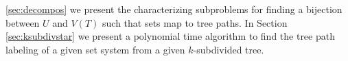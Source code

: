 \documentclass{fsttcs}
\def\cF{{\cal F}}
\def\cH{{\cal H}}
\def\F{{\mathcal F}}
\begin{document}
\ref{sec:decompos} we present the characterizing subproblems for finding a
bijection between $U$ and $V(T)$ such that sets map to tree
paths. In Section \ref{sec:ksubdivstar} we present a polynomial time
algorithm to find the tree path labeling of a given set system from a
given $k$-subdivided tree.





\end{document}
